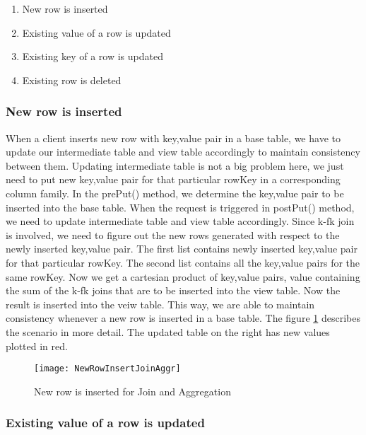\documentclass[11pt,a4paper,bibtotoc,idxtotoc,headsepline,footsepline,footexclude,BCOR12mm,DIV13]{scrbook}
\begin{document}
\begin{enumerate}
    \item New row is inserted
    \item Existing value of a row is updated
    \item Existing key of a row is updated
    \item Existing row is deleted
\end{enumerate}

\subsubsection{New row is inserted}

When a client inserts new row with key,value pair in a base table, we have to update our intermediate table and view table accordingly to maintain consistency between them. Updating intermediate table is not a big problem here, we just need to put new key,value pair for that particular rowKey in a corresponding column family. In the prePut() method, we determine the key,value pair to be inserted into the base table. When the request is triggered in postPut() method, we need to update intermediate table and view table accordingly. Since k-fk join is involved, we need to figure out the new rows generated with respect to the newly inserted key,value pair. The first list contains newly inserted key,value pair for that particular rowKey. The second list contains all the key,value pairs for the same rowKey. Now we get a cartesian product of key,value pairs, value containing the sum of the k-fk joins that are to be inserted into the view table. Now the result is inserted into the veiw table. This way, we are able to maintain consistency whenever a new row is inserted in a base table.
The figure \ref{sec:insertnewrowjoinandaggr} describes the scenario in more detail. The updated table on the right has new values plotted in red.

\begin{figure}
    \centering
    \texttt{[image: NewRowInsertJoinAggr]}
    \caption{New row is inserted for Join and Aggregation}
    \label{sec:insertnewrowjoinandaggr}
    
\end{figure}

\newpage

\subsubsection{Existing value of a row is updated}
\end{document}
